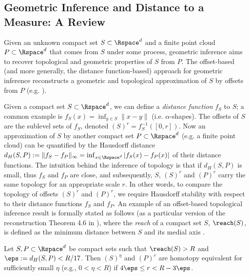 \documentclass[11pt]{myclass}
\begin{document}
\subsection{Geometric Inference and Distance to a Measure: A Review}
\label{sec:ball}

Given an unknown compact set $S \subset \Rspace^d$ and a finite point cloud $P \subset \Rspace^d$ that comes from $S$ under some process, geometric inference aims to recover topological and geometric properties of $S$ from $P$. The offset-based (and more generally, the distance function-based) approach for geometric inference reconstructs a geometric and topological approximation of $S$ by offsets from $P$ (e.g. \cite{ChazalCohen-SteinerLieutier2009b,ChazalCohen-SteinerLieutier2009,ChazalCohen-SteinerMerigot2011,ChazalLieutier2005,ChazalLieutier2006}).  


Given a compact set $S \subset \Rspace^d$, we can define a \emph{distance function} $f_S$ to  $S$; a common example is $f_S(x) = \inf_{y \in S} \|x - y\|$ (i.e. $\alpha$-shapes).
The offsets of $S$ are the sublevel sets of $f_S$, denoted $(S)^r = f_S^{-1}([0,r])$.
Now an approximation of $S$ by another compact set $P \subset \Rspace^d$ (e.g. a finite point cloud) can be quantified by the Hausdorff distance $d_H(S, P):=\|f_S - f_P\|_{\infty} = \inf_{x\in \Rspace^d}|f_S(x) - f_{P}(x)|$ of their distance functions. 
The intuition behind the inference of topology is that if $d_H(S, P)$ is small, thus $f_S$ and $f_{P}$ are close, and subsequently, $S$, ${(S)}^r$ and ${(P)}^r$ carry the same topology for an appropriate scale $r$. 
In other words, to compare the topology of offsets ${(S)}^r$ and ${(P)}^r$, 
we require Hausdorff stability with respect to their distance functions $f_S$ and $f_P$.  
 An example of an offset-based topological inference result is formally stated as follows (as a particular version of the reconstruction Theorem 4.6 in \cite{ChazalCohen-SteinerLieutier2009}), 
 where the \emph{reach} of a compact set $S$, $\reach(S)$, is defined as the minimum distance between $S$ and its medial axis \cite{Merigot2010}. 

\begin{theorem}
\label{thm:recon-fP}
Let $S, P \subset \Rspace^d$ be compact sets such that $\reach(S) > R$ and $\eps:= d_H(S, P) < R/17$. Then $(S)^\eta$ and ${(P)}^{r}$ are homotopy equivalent for sufficiently small $\eta$ (e.g., $0 < \eta < R$) if $4\eps \leq r <  R-3\eps$.
\end{theorem}
\end{document}

